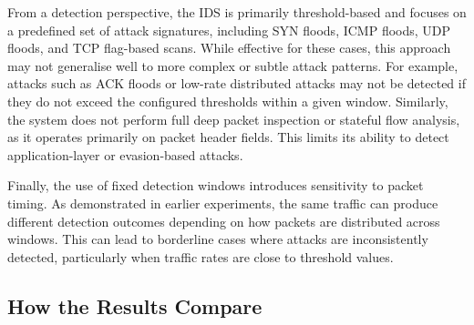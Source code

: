 From a detection perspective, the IDS is primarily threshold-based and focuses
on a predefined set of attack signatures, including SYN floods, ICMP floods,
UDP floods, and TCP flag-based scans. While effective for these cases, this
approach may not generalise well to more complex or subtle attack patterns.
For example, attacks such as ACK floods or low-rate distributed attacks may not
be detected if they do not exceed the configured thresholds within a given
window. Similarly, the system does not perform full deep packet inspection or
stateful flow analysis, as it operates primarily on packet header fields.
This limits its ability to detect application-layer or evasion-based attacks.

Finally, the use of fixed detection windows introduces sensitivity to packet
timing. As demonstrated in earlier experiments, the same traffic can produce
different detection outcomes depending on how packets are distributed across
windows. This can lead to borderline cases where attacks are inconsistently
detected, particularly when traffic rates are close to threshold values.


\subsection{How the Results Compare}